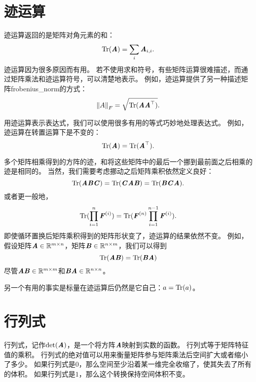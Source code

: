 \section{迹运算}
\label{sec:the_trace_operator}

迹运算返回的是矩阵对角元素的和：
\begin{equation}
    \text{Tr}(\boldsymbol{\mathit{A}})= \sum_i \boldsymbol{\mathit{A}}_{i,i}.
\end{equation}
迹运算因为很多原因而有用。
若不使用求和符号，有些矩阵运算很难描述，而通过矩阵乘法和迹运算符号，可以清楚地表示。
例如，迹运算提供了另一种描述矩阵\gls{frobenius_norm}的方式：
\begin{equation}
    \norm{A}_F = \sqrt{\text{Tr}(\MA \MA^\top)}.
    \label{eq:2.49}
\end{equation}


用迹运算表示表达式，我们可以使用很多有用的等式巧妙地处理表达式。
例如，迹运算在转置运算下是不变的：
\begin{equation}
    \text{Tr}(\boldsymbol{\mathit{A}})=\text{Tr}(\boldsymbol{\mathit{A}}^\top).
\end{equation}


多个矩阵相乘得到的方阵的迹，和将这些矩阵中的最后一个挪到最前面之后相乘的迹是相同的。
当然，我们需要考虑挪动之后矩阵乘积依然定义良好：
\begin{equation}
\text{Tr}(\boldsymbol{\mathit{A}}\boldsymbol{\mathit{B}}\boldsymbol{\mathit{C}})=\text{Tr}(\boldsymbol{\mathit{C}}\boldsymbol{\mathit{A}}\boldsymbol{\mathit{B}})= \text{Tr}(\boldsymbol{\mathit{B}}\boldsymbol{\mathit{C}}\boldsymbol{\mathit{A}}).
\end{equation}
或者更一般地，
\begin{equation} 
\Tr(\prod_{i=1}^n \MF^{(i)})= \Tr(\MF^{(n)} \prod_{i=1}^{n-1} \MF^{(i)}).
\label{eq:2.52}
\end{equation}
即使循环置换后矩阵乘积得到的矩阵形状变了，迹运算的结果依然不变。
例如，假设矩阵$\boldsymbol{\mathit{A}}\in \mathbb{R}^{m\times n}$，矩阵$\boldsymbol{\mathit{B}}\in \mathbb{R}^{n\times m}$，我们可以得到
\begin{equation} 
    \text{Tr}(\boldsymbol{\mathit{A}}\boldsymbol{\mathit{B}})= \text{Tr}(\boldsymbol{\mathit{B}}\boldsymbol{\mathit{A}})
\end{equation}
尽管$\boldsymbol{\mathit{A}}\boldsymbol{\mathit{B}} \in \mathbb{R}^{m\times m}$和$\boldsymbol{\mathit{B}}\boldsymbol{\mathit{A}} \in \mathbb{R}^{n\times n}$。



另一个有用的事实是标量在迹运算后仍然是它自己：$a=\text{Tr}(a)$。




\section{行列式}
\label{sec:the_determinant}

行列式，记作$\text{det}(\boldsymbol{\mathit{A}})$，是一个将方阵$\boldsymbol{\mathit{A}}$映射到实数的函数。
行列式等于矩阵特征值的乘积。
行列式的绝对值可以用来衡量矩阵参与矩阵乘法后空间扩大或者缩小了多少。
如果行列式是$0$，那么空间至少沿着某一维完全收缩了，使其失去了所有的体积。
如果行列式是$1$，那么这个转换保持空间体积不变。




